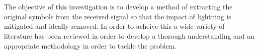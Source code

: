 \\\\
The objective of this investigation is to develop a method of extracting the original symbols from the received signal so that the impact of lightning is mitigated and ideally removed. In order to acheive this a wide variety of literature has been reviewed in order to develop a thorough understanding and an appropriate methodology in order to tackle the problem. 


